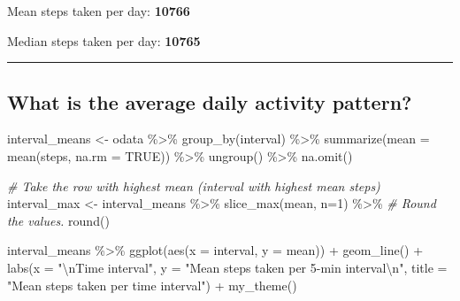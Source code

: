 \documentclass[
  paper=a4,
  ,captions=tableheading
]{scrartcl}
\newenvironment{Shaded}{\begin{snugshade}}{\end{snugshade}}
\newcommand{\AttributeTok}[1]{\textcolor[rgb]{0.77,0.63,0.00}{#1}}
\newcommand{\CommentTok}[1]{\textcolor[rgb]{0.56,0.35,0.01}{\textit{#1}}}
\newcommand{\ConstantTok}[1]{\textcolor[rgb]{0.00,0.00,0.00}{#1}}
\newcommand{\DecValTok}[1]{\textcolor[rgb]{0.00,0.00,0.81}{#1}}
\newcommand{\FunctionTok}[1]{\textcolor[rgb]{0.00,0.00,0.00}{#1}}
\newcommand{\NormalTok}[1]{#1}
\newcommand{\OtherTok}[1]{\textcolor[rgb]{0.56,0.35,0.01}{#1}}
\newcommand{\SpecialCharTok}[1]{\textcolor[rgb]{0.00,0.00,0.00}{#1}}
\newcommand{\StringTok}[1]{\textcolor[rgb]{0.31,0.60,0.02}{#1}}
\begin{document}
Mean steps taken per day: \textbf{10766}

Median steps taken per day: \textbf{10765}

\begin{center}\rule{0.5\linewidth}{0.5pt}\end{center}

\hypertarget{what-is-the-average-daily-activity-pattern}{%
\subsection{What is the average daily activity
pattern?}\label{what-is-the-average-daily-activity-pattern}}

\begin{Shaded}
\begin{Highlighting}[]
\NormalTok{interval\_means }\OtherTok{\textless{}{-}}\NormalTok{ odata }\SpecialCharTok{\%\textgreater{}\%}
  \FunctionTok{group\_by}\NormalTok{(interval) }\SpecialCharTok{\%\textgreater{}\%}
  \FunctionTok{summarize}\NormalTok{(}\AttributeTok{mean =} \FunctionTok{mean}\NormalTok{(steps, }\AttributeTok{na.rm =} \ConstantTok{TRUE}\NormalTok{)) }\SpecialCharTok{\%\textgreater{}\%}
  \FunctionTok{ungroup}\NormalTok{() }\SpecialCharTok{\%\textgreater{}\%}
  \FunctionTok{na.omit}\NormalTok{()}

\CommentTok{\# Take the row with highest mean (interval with highest mean steps)}
\NormalTok{interval\_max }\OtherTok{\textless{}{-}}\NormalTok{ interval\_means }\SpecialCharTok{\%\textgreater{}\%}
  \FunctionTok{slice\_max}\NormalTok{(mean, }\AttributeTok{n=}\DecValTok{1}\NormalTok{) }\SpecialCharTok{\%\textgreater{}\%}
  \CommentTok{\# Round the values.}
  \FunctionTok{round}\NormalTok{()}

\NormalTok{interval\_means }\SpecialCharTok{\%\textgreater{}\%}
  \FunctionTok{ggplot}\NormalTok{(}\FunctionTok{aes}\NormalTok{(}\AttributeTok{x =}\NormalTok{ interval, }\AttributeTok{y =}\NormalTok{ mean)) }\SpecialCharTok{+}
  \FunctionTok{geom\_line}\NormalTok{() }\SpecialCharTok{+}
  \FunctionTok{labs}\NormalTok{(}\AttributeTok{x =} \StringTok{"}\SpecialCharTok{\textbackslash{}n}\StringTok{Time interval"}\NormalTok{,}
       \AttributeTok{y =} \StringTok{"Mean steps taken per 5{-}min interval}\SpecialCharTok{\textbackslash{}n}\StringTok{"}\NormalTok{,}
       \AttributeTok{title =} \StringTok{"Mean steps taken per time interval"}\NormalTok{) }\SpecialCharTok{+} 
  \FunctionTok{my\_theme}\NormalTok{()}
\end{Highlighting}
\end{Shaded}
\end{document}
